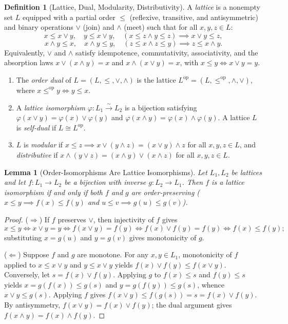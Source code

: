 \documentclass[11pt]{article}
\newtheorem{lemma}[theorem]{Lemma}
\theoremstyle{definition}
\newtheorem{definition}[theorem]{Definition}
\newcommand{\op}{\mathrm{op}}
\begin{document}
\begin{definition}[Lattice, Dual, Modularity, Distributivity]
\label{def:lattice}
A \emph{lattice} is a nonempty set $L$ equipped with a partial order $\le$
(reflexive, transitive, and antisymmetric) and binary operations $\vee$ (join)
and $\wedge$ (meet) such that for all $x, y, z \in L$:
\[
  x \le x \vee y, \quad y \le x \vee y, \quad
  (x \le z \wedge y \le z) \implies x \vee y \le z,
\]
\[
  x \wedge y \le x, \quad x \wedge y \le y, \quad
  (z \le x \wedge z \le y) \implies z \le x \wedge y.
\]
Equivalently, $\vee$ and $\wedge$ satisfy idempotence, commutativity,
associativity, and the absorption laws $x \vee (x \wedge y) = x$ and
$x \wedge (x \vee y) = x$, with $x \le y \iff x \vee y = y$.
\begin{enumerate}
  \item The \emph{order dual} of $L = (L, \le, \vee, \wedge)$ is the lattice
  $L^{\op} = (L, \le^{\op}, \wedge, \vee)$, where $x \le^{\op} y \iff y \le x$.
  \item A \emph{lattice isomorphism} $\varphi : L_1 \xrightarrow{\sim} L_2$ is a
  bijection satisfying $\varphi(x \vee y) = \varphi(x) \vee \varphi(y)$ and
  $\varphi(x \wedge y) = \varphi(x) \wedge \varphi(y)$. A lattice $L$ is
  \emph{self-dual} if $L \cong L^{\op}$.
  \item $L$ is \emph{modular} if $x \le z \implies x \vee (y \wedge z) =
  (x \vee y) \wedge z$ for all $x, y, z \in L$, and \emph{distributive} if
  $x \wedge (y \vee z) = (x \wedge y) \vee (x \wedge z)$ for all $x, y, z \in L$.
\end{enumerate}
\end{definition}

\begin{lemma}[Order-Isomorphisms Are Lattice Isomorphisms]
\label{lem:order-iso}
Let $L_1, L_2$ be lattices and let $f : L_1 \to L_2$ be a bijection with inverse
$g : L_2 \to L_1$. Then $f$ is a lattice isomorphism if and only if both $f$ and
$g$ are order-preserving ($x \le y \implies f(x) \le f(y)$ and
$u \le v \implies g(u) \le g(v)$).
\end{lemma}

\begin{proof}
($\Rightarrow$) If $f$ preserves $\vee$, then injectivity of $f$ gives
\[
  x \le y \iff x \vee y = y \iff f(x \vee y) = f(y) \iff f(x) \vee f(y) = f(y) \iff f(x) \le f(y);
\]
substituting $x = g(u)$ and $y = g(v)$ gives monotonicity of $g$.

($\Leftarrow$) Suppose $f$ and $g$ are monotone. For any $x, y \in L_1$,
monotonicity of $f$ applied to $x \le x \vee y$ and $y \le x \vee y$ yields
$f(x) \vee f(y) \le f(x \vee y)$. Conversely, let $s = f(x) \vee f(y)$. Applying
$g$ to $f(x) \le s$ and $f(y) \le s$ yields $x = g(f(x)) \le g(s)$ and
$y = g(f(y)) \le g(s)$, whence $x \vee y \le g(s)$. Applying $f$ gives
$f(x \vee y) \le f(g(s)) = s = f(x) \vee f(y)$. By antisymmetry,
$f(x \vee y) = f(x) \vee f(y)$; the dual argument gives
$f(x \wedge y) = f(x) \wedge f(y)$.
\end{proof}
\end{document}
